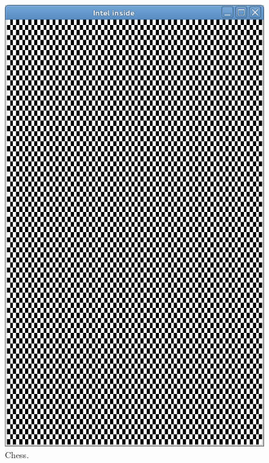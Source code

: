 \begin{figure}
  \includegraphics[width=\linewidth]{img/imgchess.png}
  \caption[Chess benchmark screen capture]{Chess.}
  \label{fig:benchmarks_chess}
  \endminipage\hfill

\end{figure}
